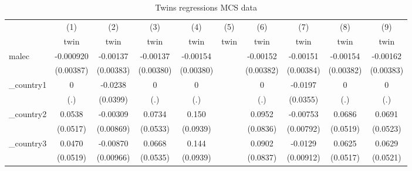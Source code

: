 \begin{table}[htbp]\centering
\def\sym#1{\ifmmode^{#1}\else\(^{#1}\)\fi}
\caption{Twins regressions MCS data}
\begin{tabular}{l*{9}{c}}
\hline\hline
            &\multicolumn{1}{c}{(1)}&\multicolumn{1}{c}{(2)}&\multicolumn{1}{c}{(3)}&\multicolumn{1}{c}{(4)}&\multicolumn{1}{c}{(5)}&\multicolumn{1}{c}{(6)}&\multicolumn{1}{c}{(7)}&\multicolumn{1}{c}{(8)}&\multicolumn{1}{c}{(9)}\\
            &\multicolumn{1}{c}{twin}&\multicolumn{1}{c}{twin}&\multicolumn{1}{c}{twin}&\multicolumn{1}{c}{twin}&\multicolumn{1}{c}{twin}&\multicolumn{1}{c}{twin}&\multicolumn{1}{c}{twin}&\multicolumn{1}{c}{twin}&\multicolumn{1}{c}{twin}\\
\hline
malec       &   -0.000920         &    -0.00137         &    -0.00137         &    -0.00154         &                     &    -0.00152         &    -0.00151         &    -0.00154         &    -0.00162         \\
            &   (0.00387)         &   (0.00383)         &   (0.00380)         &   (0.00380)         &                     &   (0.00382)         &   (0.00384)         &   (0.00382)         &   (0.00383)         \\
[1em]
\_country1   &           0         &     -0.0238         &           0         &           0         &                     &           0         &     -0.0197         &           0         &           0         \\
            &         (.)         &    (0.0399)         &         (.)         &         (.)         &                     &         (.)         &    (0.0355)         &         (.)         &         (.)         \\
[1em]
\_country2   &      0.0538         &    -0.00309         &      0.0734         &       0.150         &                     &      0.0952         &    -0.00753         &      0.0686         &      0.0691         \\
            &    (0.0517)         &   (0.00869)         &    (0.0533)         &    (0.0939)         &                     &    (0.0836)         &   (0.00792)         &    (0.0519)         &    (0.0523)         \\
[1em]
\_country3   &      0.0470         &    -0.00870         &      0.0668         &       0.144         &                     &      0.0902         &     -0.0129         &      0.0625         &      0.0629         \\
            &    (0.0519)         &   (0.00966)         &    (0.0535)         &    (0.0939)         &                     &    (0.0837)         &   (0.00912)         &    (0.0517)         &    (0.0521)         \\

\end{tabular}
\end{table}
